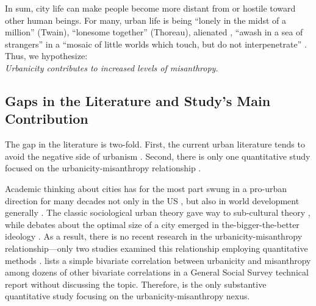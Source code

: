 \documentclass[11pt, letterpaper]{article}
\begin{document}
\begin{spacing}{1.4}
In sum, city life can make people become more distant from or hostile toward other human beings. %
For many, urban life is being ``lonely in the midst of a million'' (Twain), ``lonesome together''
(Thoreau), alienated \citep{wirth38,nettler1957measure}, ``awash in a sea of strangers''
\citep[Merry cited in][p. 99]{wilson85} in a ``mosaic of little worlds which touch, but do not interpenetrate'' \citep[][p. 40]{park84}. Thus, we hypothesize: \\
 
{\indent\hspace{1in}\textit{Urbanicity contributes to increased levels of misanthropy.\\}}
     

\subsection*{Gaps in the Literature and Study's Main Contribution} 

The gap in the literature is two-fold. First, the current urban literature tends
to avoid the negative side of  urbanism
\citep{thrift05,amin06,aokCityBook15,peck16}. Second, there is only one
quantitative study  focused on the urbanicity-misanthropy relationship \citep{wilson85}. 

Academic thinking about cities has for the most part swung in a pro-urban direction for many decades not only in the US \citep{hansonCityJournalautumn15}, but also in world development generally \citep{lipton77}. The classic sociological urban theory \citep{wirth38,milgram70,park15,park84,simmel03,tonnies57} gave way to
  sub-cultural theory \citep{fischer75,fischer95,wilson85, palisi83}, while debates about the optimal size of a city \citep{richardson72,singell74,alonso60,alonso71,elgin75,capello00} emerged in the-bigger-the-better ideology \citep{glaeser11}. As a result, there is no recent research in the urbanicity-misanthropy relationship---only two studies examined this relationship employing quantitative methods \citep{wilson85,smith97}. \citet{smith97} lists a simple bivariate correlation between urbanicity and misanthropy among dozens of other bivariate correlations in a General Social Survey technical report without discussing the topic. 
Therefore, \citet{wilson85} is the only substantive quantitative study focusing on the urbanicity-misanthropy nexus.%



\end{spacing}
\end{document}
